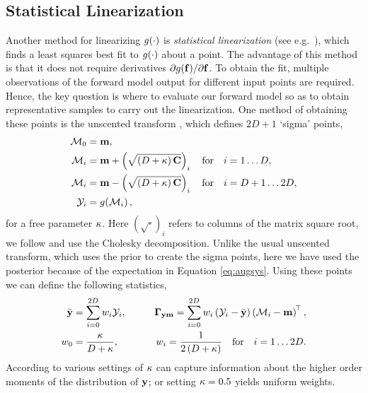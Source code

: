\documentclass{article} %
\begin{document}
\subsection{Statistical Linearization}

Another method for linearizing $g\!\left({{\cdot}}\right)$ is \emph{statistical
    linearization} (see e.g.~\cite{Geist2010}), which finds a least squares
best fit to $g\!\left({{\cdot}}\right)$ about a point. The advantage of this method is
that it does not require derivatives
$\partial g\!\left({{\mathbf{f}}}\right)\!/\partial\mathbf{f}$. To obtain the fit, multiple
observations of the forward model output for different input points are
required. Hence, the key question is where to evaluate our forward model so as
to obtain representative samples to carry out the linearization.  One method of
obtaining these points is the unscented transform \cite{Julier2004}, which
defines $2D+1$ `sigma' points,
\begin{align}
    \mathcal{M}_0 &= \mathbf{m},
        \label{eq:spoint0} \\
    \mathcal{M}_i &= \mathbf{m} + \left({\sqrt{\left({D + \kappa}\right) \mathbf{C}}}\right)_i \quad
        \text{for} \quad i = 1 \ldots D, \\
    \mathcal{M}_i &= \mathbf{m} - \left({\sqrt{\left({D + \kappa}\right) \mathbf{C}}}\right)_i \quad
        \text{for} \quad i = D+1 \ldots 2D,
        \label{eq:spointi} \\
    \mathcal{Y}_i &= g\!\left({{\mathcal{M}_i}}\right) \text{,}
\end{align}
for a free parameter $\kappa$.  Here $(\sqrt{\cdot})_i$ refers to columns of
the matrix square root, we follow \cite{Julier2004} and use the Cholesky
decomposition. Unlike the usual unscented transform, which uses the prior to
create the sigma points, here we have used the posterior because of the
expectation in Equation \eqref{eq:augsys}. Using these points we can define the
following statistics,
\begin{alignat}{2}
    \bar{\mathbf{y}} &= \sum^{2D}_{i=0} w_i \mathcal{Y}_i,
    \qquad
    &\boldsymbol\Gamma_{\mathbf{y}\mathbf{m}} = \sum^{2D}_{i=0} w_i \left({\mathcal{Y}_i - \bar{\mathbf{y}}}\right)
        \left({\mathcal{M}_i - \mathbf{m}}\right)^{\!\top},
    \label{eq:slstats} \\
    w_0 &= \frac{\kappa}{D + \kappa},
        &w_i = \frac{1}{2\left({D + \kappa}\right)}
        \quad \text{for} \quad i = 1 \ldots 2D \text{.}
    \label{eq:slweights}
\end{alignat}
According to \cite{Julier2004} various settings
of $\kappa$ can capture information about the higher order moments of the
distribution of $\mathbf{y}$; or setting $\kappa = 0.5$ yields uniform weights.
\end{document}
